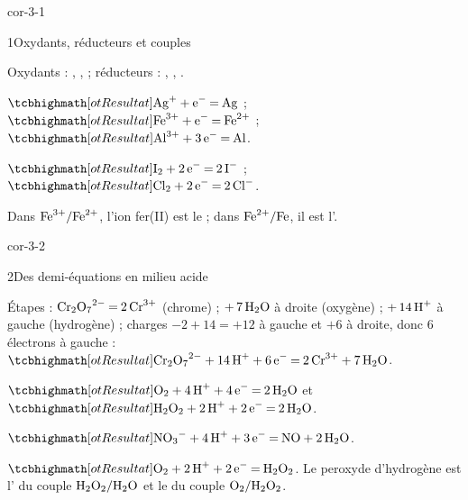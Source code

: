\corrigesSouples

\begin{blocLivre}{cor-3-1}
\begin{corrige}{1}{Oxydants, réducteurs et couples}
\begin{questions}
\item Oxydants : , ,  ; réducteurs : , , .
\item $\res{\ce{Ag+ + e- = Ag}}$ ; $\res{\ce{Fe^{3+} + e- = Fe^{2+}}}$ ; $\res{\ce{Al^{3+} + 3e- = Al}}$.
\item $\res{\ce{I2 + 2e- = 2I-}}$ ; $\res{\ce{Cl2 + 2e- = 2Cl-}}$.
\item Dans $\ce{Fe^{3+}}/\ce{Fe^{2+}}$, l'ion fer(II) est le  ; dans $\ce{Fe^{2+}}/\ce{Fe}$, il est l'.
\end{questions}
\end{corrige}
\end{blocLivre}
\begin{blocLivre}{cor-3-2}
\begin{corrige}{2}{Des demi-équations en milieu acide}
\begin{questions}
\item Étapes : $\ce{Cr2O7^{2-} = 2Cr^{3+}}$ (chrome) ; $+\,7\,\ce{H2O}$ à droite (oxygène) ; $+\,14\,\ce{H+}$ à gauche (hydrogène) ; charges $-2+14=+12$ à
gauche et $+6$ à droite, donc 6 électrons à gauche : $\res{\ce{Cr2O7^{2-} + 14H+ + 6e- = 2Cr^{3+} + 7H2O}}$.
\item $\res{\ce{O2 + 4H+ + 4e- = 2H2O}}$ et $\res{\ce{H2O2 + 2H+ + 2e- = 2H2O}}$.
\item $\res{\ce{NO3- + 4H+ + 3e- = NO + 2H2O}}$.
\item $\res{\ce{O2 + 2H+ + 2e- = H2O2}}$. Le peroxyde d'hydrogène est l' du couple $\ce{H2O2}/\ce{H2O}$ et le
 du couple $\ce{O2}/\ce{H2O2}$.
\end{questions}
\end{corrige}
\end{blocLivre}
